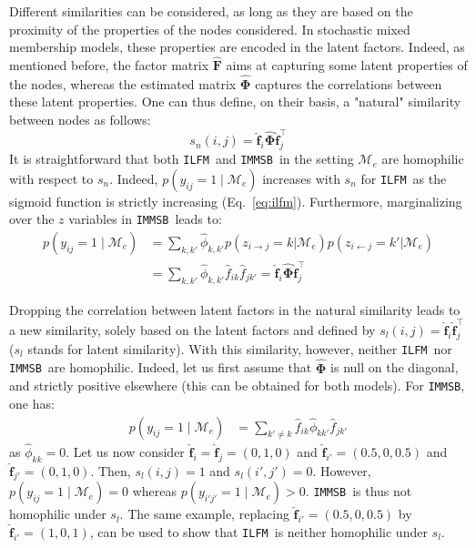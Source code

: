 \documentclass[9pt,twocolumn,twoside]{pnas-new}
\newcommand{\ifm}{\texttt{ILFM}}
\newcommand{\imb}{\texttt{IMMSB}}
\newcommand{\pr}{p}
\newcommand{\M}{\mathcal{M}}
\newcommand{\mat}[1]{\mathbf{#1}}
\begin{document}
Different similarities can be considered, as long as they are based on the proximity of the properties of the nodes considered. In stochastic mixed membership models, these properties are encoded in the latent factors. Indeed, as mentioned before, the factor matrix $\mat{\hat{F}}$ aims at capturing some latent properties of the nodes, whereas the estimated matrix $\mat{\hat{\Phi}}$ captures the correlations between these latent properties. One can thus define, on their basis, a "natural" similarity between nodes as follows:
%
\begin{equation}
s_n(i,j) = \mat{\hat{f}}_{i} \mat{\hat{\Phi}} \mat{\hat{f}}_j^\top \nonumber
\end{equation}
%
It is straightforward that both \ifm\ and \imb\ in the setting $\mathcal{M}_e$ are homophilic with respect to $s_n$. Indeed, $\pr(y_{ij}=1 \mid \mathcal{M}_e)$ increases with $s_n$ for \ifm\ as the sigmoid function is strictly increasing (Eq.~\ref{eq:ilfm}). Furthermore, marginalizing over the $z$ variables in \imb\ leads to:
%
\begin{align}
\pr(y_{ij} =1 \mid \mathcal{M}_e) & = \sum_{k,k'} \hat{\phi}_{k,k'} \pr(z_{i \rightarrow j}=k | \mathcal{M}_e) \pr(z_{i \leftarrow j}=k' | \mathcal{M}_e) \nonumber \\
& = \sum_{k,k'} \hat{\phi}_{k,k'} \hat{f}_{ik} \hat{f}_{jk'} = \mat{\hat{f}}_{i} \mat{\hat{\Phi}} \mat{\hat{f}}_j^\top \nonumber
\end{align}

Dropping the correlation between latent factors in the natural similarity leads to a new similarity, solely based on the latent factors and defined by $s_l(i,j) = \mat{\hat{f}}_{i} \mat{\hat{f}}_j^\top \nonumber$ ($s_l$ stands for latent similarity). With this similarity, however, neither \ifm\  nor \imb\ are homophilic. Indeed, let us first assume that $\mat{\hat{\Phi}}$ is null on the diagonal, and strictly positive elsewhere (this can be obtained for both models). For \imb, one has:
%
\begin{align}
\pr(y_{ij}=1 \mid \M_e) & = \sum_{k' \neq k} \hat{f}_{ik} \hat{\phi}_{kk'} \hat{f}_{jk'} \nonumber 
\end{align}
%
as $\hat{\phi}_{kk} = 0$. Let us now consider $\mat{\hat{f}}_i=\mat{\hat{f}}_j=(0,1,0)$ and $\mat{\hat{f}}_{i'}=(0.5,0,0.5)$ and $\mat{\hat{f}}_{j'}=(0,1,0)$. Then, $s_l(i,j)=1$ and $s_l(i',j')=0$. However, $\pr(y_{ij}=1 \mid \M_e) = 0$ whereas $\pr(y_{i'j'}=1 \mid \M_e) > 0$. \imb\ is thus not homophilic under $s_l$. The same example, replacing $\mat{\hat{f}}_{i'}=(0.5,0,0.5)$ by $\mat{\hat{f}}_{i'}=(1,0,1)$, can be used to show that \ifm\ is neither homophilic under $s_l$.
\end{document}
